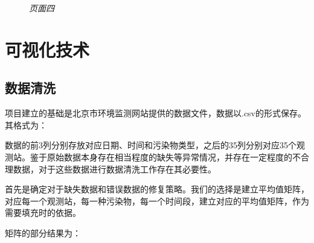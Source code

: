 ﻿\documentclass{article}
\begin{document}
\begin{CJK*}{GBK}{song}
\begin{figure}[ht]
\centering
{}
\caption{\textit{页面四}}
\end{figure}


\section{可视化技术}

\subsection{数据清洗}
\qquad 项目建立的基础是北京市环境监测网站提供的数据文件，数据以.csv的形式保存。其格式为：

\begin{figure}[ht]
\centering
{}
\end{figure}


数据的前3列分别存放对应日期、时间和污染物类型，之后的35列分别对应35个观测站。鉴于原始数据本身存在相当程度的缺失等异常情况，并存在一定程度的不合理数据，对于这些数据进行数据清洗工作存在其必要性。

首先是确定对于缺失数据和错误数据的修复策略。我们的选择是建立平均值矩阵，对应每一个观测站，每一种污染物，每一个时间段，建立对应的平均值矩阵，作为需要填充时的依据。

矩阵的部分结果为：

\begin{figure}[ht]
\centering
{}
\end{figure}


\end{CJK*}
\end{document}

